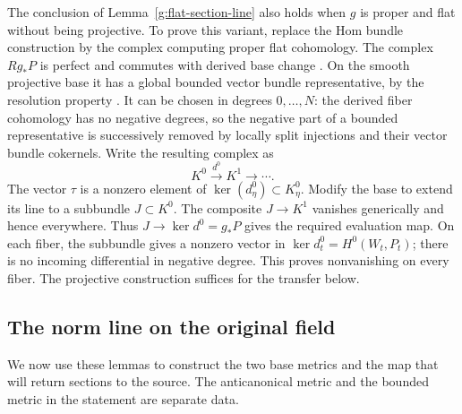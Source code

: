 \begin{remark}
The conclusion of Lemma~\ref{g:flat-section-line} also holds when
\(g\) is proper and flat without being projective. To prove this
variant, replace the Hom bundle construction by the complex computing
proper flat cohomology. The complex \(Rg_*P\) is perfect and commutes
with derived base change \cite[Tag~0DJT]{StacksProject}. On the smooth
projective base it has a global bounded vector bundle representative,
by the resolution property \cite[Tags~0F87 and 0F8F]{StacksProject}.
It can be chosen in degrees \(0,\ldots,N\): the derived fiber
cohomology has no negative degrees, so the negative part of a bounded
representative is successively removed by locally split injections and
their vector bundle cokernels. Write the resulting complex as
\[
              K^0\xrightarrow{d^0}K^1\longrightarrow\cdots.
\]
The vector \(\tau\) is a nonzero element of
\(\ker(d^0_{\eta})\subset K^0_{\eta}\). Modify the base to extend its
line to a subbundle \(J\subset K^0\). The composite \(J\to K^1\)
vanishes generically and hence everywhere. Thus
\(J\to\ker d^0=g_*P\) gives the required evaluation map.
On each fiber, the subbundle gives a nonzero vector in
\(\ker d^0_t=H^0(W_t,P_t)\); there is no incoming differential in
negative degree. This proves nonvanishing on every fiber. The
projective construction suffices for the transfer below.
\end{remark}

\subsection{The norm line on the original field}

We now use these lemmas to construct the two base metrics and the map
that will return sections to the source.  The anticanonical metric and
the bounded metric in the statement are separate data.

